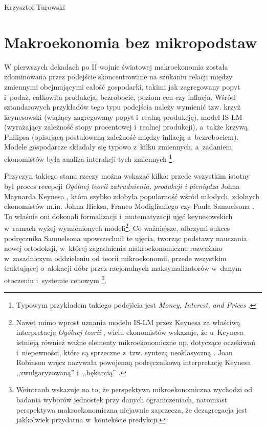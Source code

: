\begin{artplenv}{Krzysztof Turowski}
\section{Makroekonomia bez mikropodstaw}
W pierwszych dekadach po II wojnie światowej makroekonomia została zdominowana przez podejście skoncentrowane na
szukaniu relacji między zmiennymi obejmującymi całość gospodarki, takimi jak zagregowany popyt i~podaż, całkowita
produkcja, bezrobocie, poziom cen czy inflacja. Wśród sztandarowych przykładów tego typu podejścia należy wymienić tzw.
krzyż keynesowski (wiążący zagregowany popyt i~realną produkcję), model IS-LM (wyrażający zależność stopy
procentowej i~realnej produkcji), a~także krzywą Philipsa (opisującą postulowaną zależność między inflacją a~bezrobociem).
Modele gospodarcze składały się typowo z~kilku zmiennych, a~zadaniem ekonomistów była analiza interakcji tych zmiennych
\parencite{lachmann_macro-economic_1973}\footnote{Typowym przykładem takiego podejścia jest \textit{Money, Interest,
and Prices}
\parencite{patinkin_money_1956}.
}.

Przyczyn takiego stanu rzeczy można wskazać kilka: przede wszystkim istotny był proces recepcji \textit{Ogólnej teorii
zatrudnienia, produkcji i} \textit{pieniądza} Johna Maynarda Keynesa
\parencite*{keynes_general_1936},
która szybko
zdobyła popularność wśród młodych, zdolnych ekonomistów m.in. Johna Hicksa, Franco Modiglianiego czy Paula Samuelsona
\parencite{moggridge_diffusion_1995}.
To właśnie oni dokonali formalizacji i~matematyzacji ujęć
keynesowskich w~ramach wyżej wymienionych modeli\footnote{Nawet mimo wprost uznania modelu IS-LM przez Keynesa za właściwą
interpretację \textit{Ogólnej teorii}
\parencite{king_history_2003},
wielu ekonomistów wskazuje, że u~Keynesa
istnieją również ważne elementy mikroekonomiczne np. dotyczące oczekiwań i~niepewności, które są sprzeczne z~tzw.
syntezą neoklasyczną
\parencite{leijonhufvud_keynes_1969}.
Joan Robinson wręcz nazywała powojenną
podręcznikową interpretację Keynesa ,,zwulgaryzowaną'' i~,,bękarcią''
\parencite{robinson_what_1974}.
}. Co
ważniejsze, olbrzymi sukces podręcznika Samuelsona upowszechnił te ujęcia, tworząc podstawy nauczania nowej ortodoksji,
w~której zagadnienia makroekonomiczne rozważano w~zasadniczym oddzieleniu od teorii mikroekonomii, przede wszystkim
traktującej o~alokacji dóbr przez racjonalnych maksymalizatorów w~danym otoczeniu i~systemie cenowym
\parencite{colander_coming_1996}\footnote{Weintraub
\parencite*{weintraub_microfoundations:_1979}
wskazuje na to,
że perspektywa mikroekonomiczna wychodzi od badania wyborów jednostek przy danych ograniczeniach, natomiast perspektywa
makroekonomiczna niejawnie zaprzecza, że dezagregacja jest jakkolwiek przydatna w~kontekście predykcji.}.


\end{artplenv}
